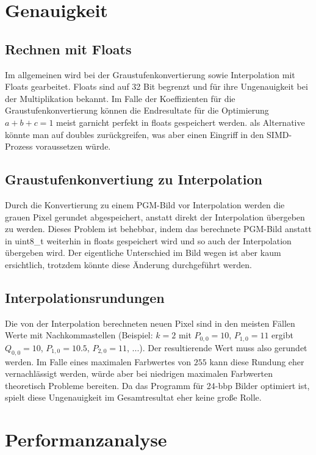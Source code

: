 \documentclass[course=erap]{aspdoc}
\begin{document}
\section{Genauigkeit}
\subsection{Rechnen mit Floats}
Im allgemeinen wird bei der Graustufenkonvertierung sowie Interpolation mit Floats gearbeitet. Floats sind auf 32 Bit begrenzt und für ihre Ungenauigkeit bei der Multiplikation bekannt. Im Falle der Koeffizienten für die Graustufenkonvertierung können die Endresultate für die Optimierung $a + b + c = 1$ meist garnicht perfekt in floats gespeichert werden. als Alternative könnte man auf doubles zurückgreifen, was aber einen Eingriff in den SIMD-Prozess voraussetzen würde.

\subsection{Graustufenkonvertiung zu Interpolation}
Durch die Konvertierung zu einem PGM-Bild vor Interpolation werden die grauen Pixel gerundet abgespeichert, anstatt direkt der Interpolation übergeben zu werden. Dieses Problem ist behebbar, indem das berechnete PGM-Bild anstatt in uint8\_t weiterhin in floats gespeichert wird und so auch der Interpolation übergeben wird. Der eigentliche Unterschied im Bild wegen ist aber kaum ersichtlich, trotzdem könnte diese Änderung durchgeführt werden.

\subsection{Interpolationsrundungen}
Die von der Interpolation berechneten neuen Pixel sind in den meisten Fällen Werte mit Nachkommastellen (Beispiel: $k = 2$ mit $P_{0,0} = 10$, $P_{1,0} = 11$ ergibt $Q_{0,0} = 10$, $P_{1,0} = 10.5$, $P_{2,0} = 11$, $...$). Der resultierende Wert muss also gerundet werden. Im Falle eines maximalen Farbwertes von $255$ kann diese Rundung eher vernachlässigt werden, würde aber bei niedrigen maximalen Farbwerten theoretisch Probleme bereiten. Da das Programm für 24-bbp Bilder optimiert ist, spielt diese Ungenauigkeit im Gesamtresultat eher keine große Rolle.



\section{Performanzanalyse}
\end{document}

